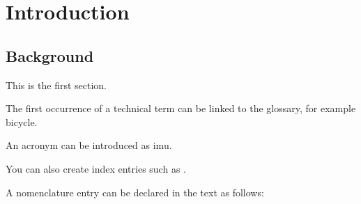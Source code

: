 
\chapter{Introduction}
\label{chap:introduction}

\section{Background}

This is the first section.

The first occurrence of a technical term can be linked to the glossary,
for example \gls{bicycle}.

An acronym can be introduced as \gls{imu}.

You can also create index entries such as
.

A nomenclature entry can be declared in the text as follows:
